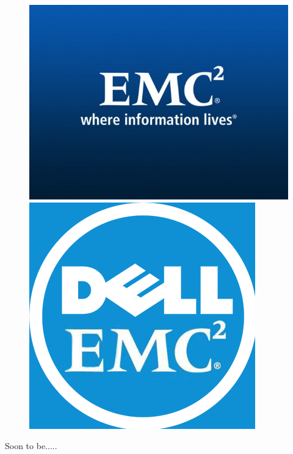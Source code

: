 \documentclass{beamer}
\theoremstyle{mystyle}
\begin{document}
\begin{frame}
    \begin{figure}
        \centering
        \begin{minipage}{.5\textwidth}
            \centering
            \includegraphics[width=.8\linewidth]{EMC-Corporation.jpg}

        \end{minipage}%
        \pause
        \begin{minipage}{.5\textwidth}
            \centering
            \includegraphics[width=.7\linewidth]{Dell_EMC.png}
           
        \end{minipage}
        
    \end{figure}
    
\centering 
Soon to be.....

\end{frame}
\end{document}
